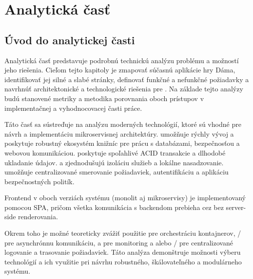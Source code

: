 \chapter{Analytická časť}\label{ch:analytics}

\section{Úvod do analytickej časti}
Analytická časť predstavuje podrobnú technickú analýzu problému a možností jeho riešenia. Cieľom tejto kapitoly je zmapovať súčasnú  aplikácie hry Dáma, identifikovať jej silné a slabé stránky, definovať funkčné a nefunkčné požiadavky a navrhnúť architektonické a technologické riešenia pre . Na základe tejto analýzy budú stanovené metriky a metodika porovnania oboch prístupov v implementačnej a vyhodnocovacej časti práce.

Táto časť sa sústreďuje na analýzu moderných technológií, ktoré sú vhodné pre návrh a implementáciu mikroservisnej architektúry.  umožňuje rýchly vývoj  a poskytuje robustný ekosystém knižníc pre prácu s databázami, bezpečnosťou a webovou komunikáciou.  poskytuje spoľahlivé ACID transakcie a dlhodobé ukladanie údajov.  a  zjednodušujú izoláciu služieb a lokálne nasadzovanie.  umožňuje centralizované smerovanie požiadaviek, autentifikáciu a aplikáciu bezpečnostných politík.

Frontend v oboch verziách systému (monolit aj mikroservisy) je implementovaný pomocou  SPA, pričom všetka komunikácia s backendom prebieha cez  bez server-side renderovania.

Okrem toho je možné teoreticky zvážiť použitie  pre orchestráciu kontajnerov, / pre asynchrónnu komunikáciu,  a  pre monitoring a  alebo / pre centralizované logovanie a trasovanie požiadaviek. Táto analýza demonštruje možnosti výberu technológií a ich využitie pri návrhu robustného, škálovateľného a modulárneho systému.

